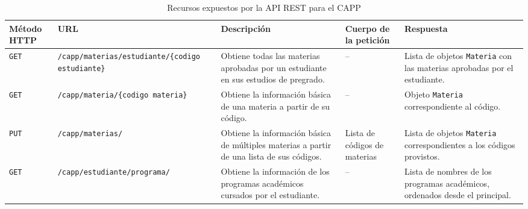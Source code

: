 \begin{table}[H]
	\centering
	\alternatecolors
	\caption{Recursos expuestos por la API REST para el CAPP}
	\label{tab:capp_api_resources}
	\begin{tabular}{p{1.5cm}p{2.6cm}p{3.8cm}p{2cm}p{3cm}}
		\hline
		\textbf{Método HTTP} & \textbf{URL}                                                                                                & \textbf{Descripción}                                                                      & \textbf{Cuerpo de la petición} & \textbf{Respuesta}                                                              \\ \hline
		\texttt{GET}         & \texttt{/capp}\newline\texttt{/materias}\newline\texttt{/estudiante}\newline\texttt{/\{codigo estudiante\}} & Obtiene todas las materias aprobadas por un estudiante en sus estudios de pregrado.       & --                             & Lista de objetos \texttt{Materia} con las materias aprobadas por el estudiante. \\
		\texttt{GET}         & \texttt{/capp}\newline\texttt{/materia}\newline\texttt{/\{codigo materia\}}                                 & Obtiene la información básica de una materia a partir de su código.                       & --                             & Objeto \texttt{Materia} correspondiente al código.                              \\
		\texttt{PUT}         & \texttt{/capp}\newline\texttt{/materias/}                                                                   & Obtiene la información básica de múltiples materias a partir de una lista de sus códigos. & Lista de códigos de materias   & Lista de objetos \texttt{Materia} correspondientes a los códigos provistos.     \\
		\texttt{GET}         & \texttt{/capp}\newline\texttt{/estudiante}\newline\texttt{/programa/}                                       & Obtiene la información de los programas académicos cursados por el estudiante.            & --                             & Lista de nombres de los programas académicos, ordenados desde el principal.     \\
	\end{tabular}
\end{table}

